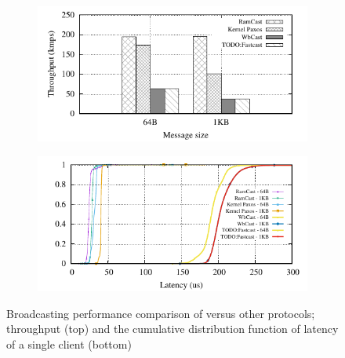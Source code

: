 \begin{figure}[htp!]
  \begin{subfigure}{\columnwidth}
    \centering
    \includegraphics[width=0.99\columnwidth]{figures/benchmark/graphs/figure-compare-single-group-throughput}
  \label{fig:tpcc_repartitioning}
  \end{subfigure}
  \begin{subfigure}{\columnwidth}
    \centering
    \includegraphics[width=0.95\columnwidth]{figures/benchmark/graphs/figure-compare-single-group-latency-cdf}
  \end{subfigure}
  \caption{Broadcasting performance comparison of \libname versus other protocols; throughput (top) and the cumulative distribution function of latency of a single client (bottom)}
\end{figure}

